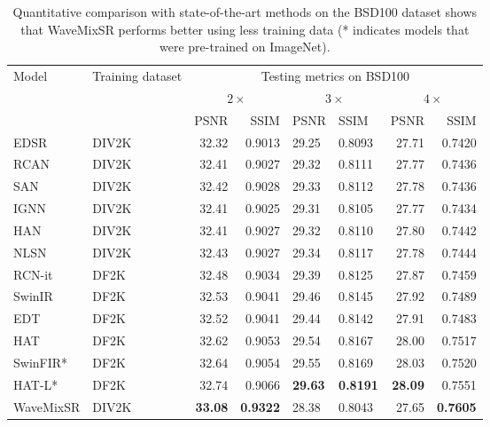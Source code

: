 \documentclass{article}
\begin{document}
\begin{table*}[]
\centering
\begin{tabular}{@{}llrrllrr@{}}
\toprule
\multirow{2}{*}{Model} & \multirow{2}{*}{Training dataset} & \multicolumn{6}{c}{Testing metrics on BSD100} \\ \cmidrule(l){3-8} 
 &  & \multicolumn{2}{c}{$2\times$} & \multicolumn{2}{c}{$3\times$} & \multicolumn{2}{c}{$4\times$} \\ \cmidrule(l){3-8} 
 &  & PSNR & SSIM & PSNR & SSIM & PSNR & SSIM \\ \midrule
EDSR~\cite{lim2017enhanced} & DIV2K & 32.32 & 0.9013 & 29.25 & 0.8093 & 27.71 & 0.7420 \\
RCAN~\cite{zhang2018image} & DIV2K & 32.41 & 0.9027 & 29.32 & 0.8111 & 27.77 & 0.7436 \\
SAN~\cite{Chen_2023_CVPR} & DIV2K & 32.42 & 0.9028 & 29.33 & 0.8112 & 27.78 & 0.7436 \\
IGNN~\cite{Chen_2023_CVPR} & DIV2K & 32.41 & 0.9025 & 29.31 & 0.8105 & 27.77 & 0.7434 \\
HAN~\cite{niu2020single} & DIV2K & 32.41 & 0.9027 & 29.32 & 0.8110 & 27.80 & 0.7442 \\
NLSN~\cite{Chen_2023_CVPR} & DIV2K & 32.43 & 0.9027 & 29.34 & 0.8117 & 27.78 & 0.7444 \\
RCN-it~\cite{Chen_2023_CVPR} & DF2K & 32.48 & 0.9034 & 29.39 & 0.8125 & 27.87 & 0.7459 \\
SwinIR~\cite{liang2021swinir} & DF2K & 32.53 & 0.9041 & 29.46 & 0.8145 & 27.92 & 0.7489 \\
EDT~\cite{li2022efficient} & DF2K & 32.52 & 0.9041 & 29.44 & 0.8142 & 27.91 & 0.7483 \\
HAT~\cite{Chen_2023_CVPR} & DF2K & 32.62 & 0.9053 & 29.54 & 0.8167 & 28.00 & 0.7517 \\
SwinFIR*~\cite{zhang2023swinfir} & DF2K & 32.64 & 0.9054 & 29.55 & 0.8169 & 28.03& 0.7520 \\
HAT-L*~\cite{Chen_2023_CVPR} & DF2K & 32.74 & 0.9066 & \textbf{29.63} & \textbf{0.8191} & \textbf{28.09} & 0.7551 \\
WaveMixSR & DIV2K & \textbf{33.08} & \textbf{0.9322} & 28.38 & 0.8043 & 27.65 & \textbf{0.7605} \\ \bottomrule
\end{tabular}
\caption{Quantitative comparison with state-of-the-art methods on the BSD100 dataset shows that WaveMixSR performs better using less training data (* indicates models that were pre-trained on ImageNet).}
\label{tab:bsd100}
\end{table*}
\end{document}
